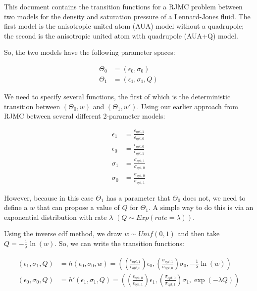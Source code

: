 \documentclass[letterpaper,12pt]{article}
\begin{document}
This document contains the transition functions for a RJMC problem between two models for the density and saturation pressure of a Lennard-Jones fluid.  The first model is the anisotropic united atom (AUA) model without a quadrupole; the second is the anisotropic united atom with quadrupole (AUA+Q) model.

So, the two models have the following parameter spaces:

\begin{align*}
\Theta_0 &= (\epsilon_0, \sigma_0) \\
\Theta_1 &= (\epsilon_1,\sigma_1,Q)
\end{align*}

We need to specify several functions, the first of which is the deterministic transition between $(\Theta_0,w)$ and $(\Theta_1,w')$.  Using our earlier approach from RJMC between several different 2-parameter models:

\begin{align*}
\epsilon_1 &= \frac{\epsilon_{opt,1}}{\epsilon_{opt,0}}\\
\epsilon_0 &= \frac{\epsilon_{opt,0}}{\epsilon_{opt,1}}\\
\sigma_1 &= \frac{\sigma_{opt,1}}{\sigma_{opt,0}}\\
\sigma_0 &= \frac{\sigma_{opt,0}}{\sigma_{opt,1}}
\end{align*}


However, because in this case $\Theta_1$ has a parameter that $\Theta_0$ does not, we need to define a $w$ that can propose a value of $Q$ for $\Theta_1$.  A simple way to do this is via an exponential distribution with rate $\lambda$ $(Q \sim Exp(rate=\lambda))$.  

Using the inverse cdf method, we draw $w \sim Unif(0,1)$ and then take $Q = -\frac{1}{\lambda} \ln(w)$. So, we can write the transition functions:

\begin{align*}
(\epsilon_1,\sigma_1, Q) &= h(\epsilon_0,\sigma_0, w) = \left ( \left ( \frac{\epsilon_{opt,1}}{\epsilon_{opt,0}} \right ) \epsilon_0, \left ( \frac{\sigma_{opt,1}}{\sigma_{opt,0}} \right ) \sigma_0, -\frac{1}{\lambda} \ln(w) \right )  \\
(\epsilon_0,\sigma_0, Q) &= h'(\epsilon_1,\sigma_1, Q) = \left ( \left ( \frac{\epsilon_{opt,0}}{\epsilon_{opt,1}} \right ) \epsilon_1, \left ( \frac{\sigma_{opt,0}}{\sigma_{opt,1}} \right ) \sigma_1, \exp(-\lambda Q) \right )
\end{align*}
\end{document}
